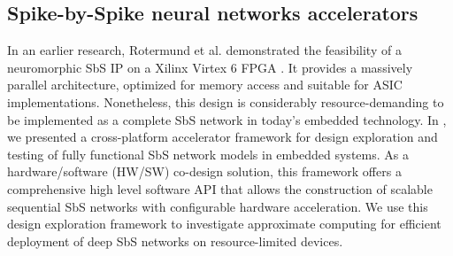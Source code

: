 \subsection{Spike-by-Spike neural networks accelerators}
In an earlier research, Rotermund et al. demonstrated the feasibility of a neuromorphic SbS IP on a Xilinx Virtex 6 FPGA \cite{rotermund2018massively}. It provides a massively parallel architecture, optimized for memory access and suitable for ASIC implementations. Nonetheless, this design is considerably resource-demanding to be implemented as a complete SbS network in today's embedded technology. In \cite{nevarez2020accelerator}, we presented a cross-platform accelerator framework for design exploration and testing of fully functional SbS network models in embedded systems. As a hardware/software (HW/SW) co-design solution, this framework offers a comprehensive high level software API that allows the construction of scalable sequential SbS networks with configurable hardware acceleration. We use this design exploration framework to investigate approximate computing for efficient deployment of deep SbS networks on resource-limited devices.
